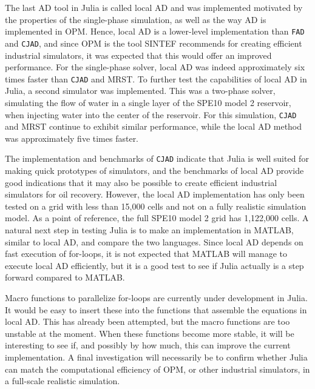 The last AD tool in Julia is called local AD and was implemented motivated by the properties of the single-phase simulation, as well as the way AD is implemented in OPM. Hence, local AD is a lower-level implementation than \texttt{FAD} and \texttt{CJAD}, and since OPM is the tool SINTEF recommends for creating efficient industrial simulators, it was expected that this would offer an improved performance. For the single-phase solver, local AD was indeed approximately six times faster than \texttt{CJAD} and MRST. To further test the capabilities of local AD in Julia, a second simulator was implemented. This was a two-phase solver, simulating the flow of water in a single layer of the SPE10 model 2 reservoir, when injecting water into the center of the reservoir. For this simulation, \texttt{CJAD} and MRST continue to exhibit similar performance, while the local AD method was approximately five times faster.

The implementation and benchmarks of \texttt{CJAD} indicate that Julia is well suited for making quick prototypes of simulators, and the benchmarks of local AD provide good indications that it may also be possible to create efficient industrial simulators for oil recovery. However, the local AD implementation has only been tested on a grid with less than 15,000 cells and not on a fully realistic simulation model. As a point of reference, the full SPE10 model 2 grid has 1,122,000 cells. A natural next step in testing Julia is to make an implementation in MATLAB, similar to local AD, and compare the two languages. Since local AD depends on fast execution of for-loops, it is not expected that MATLAB will manage to execute local AD efficiently, but it is a good test to see if Julia actually is a step forward compared to MATLAB. 

Macro functions to parallelize for-loops are currently under development in Julia. It would be easy to insert these into the functions that assemble the equations in local AD. This has already been attempted, but the macro functions are too unstable at the moment. When these functions become more stable, it will be interesting to see if, and possibly by how much, this can improve the current implementation. A final investigation will necessarily be to confirm whether Julia can match the computational efficiency of OPM, or other industrial simulators, in a full-scale realistic simulation. 

